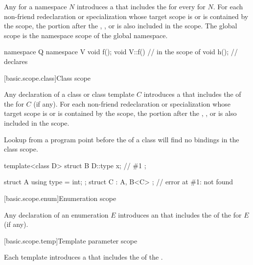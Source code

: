 \pnum
Any  for a namespace $N$ introduces
a 
that includes the 
for every  for $N$.
For each non-friend redeclaration or specialization
whose target scope is or is contained by the scope,
the portion after the
,
, or
is also included in the scope.
The global scope is
the namespace scope of the global namespace.
\begin{example}
\begin{codeblock}
namespace Q {
  namespace V { void f(); }
  void V::f() {         // in the scope of 
    void h();           // declares 
  }
}
\end{codeblock}
\end{example}

[basic.scope.class]{Class scope}

\pnum
Any declaration of a class or class template $C$ introduces
a 
that includes the  of
the  for $C$ (if any).
For each non-friend redeclaration or specialization
whose target scope is or is contained by the scope,
the portion after the
,
, or
 is also included in the scope.
\begin{note}
Lookup from a program point
before the  of a class
will find no bindings in the class scope.
\begin{example}
\begin{codeblock}
template<class D>
struct B {
  D::type x;            // \#1
};

struct A { using type = int; };
struct C : A, B<C> {};  // error at \#1:  not found
\end{codeblock}
\end{example}
\end{note}

[basic.scope.enum]{Enumeration scope}%

\pnum
Any declaration of an enumeration $E$ introduces
an 
that includes the  of
the  for $E$ (if any).

[basic.scope.temp]{Template parameter scope}%

\pnum
Each template  introduces
a 
that includes the  of
the .

